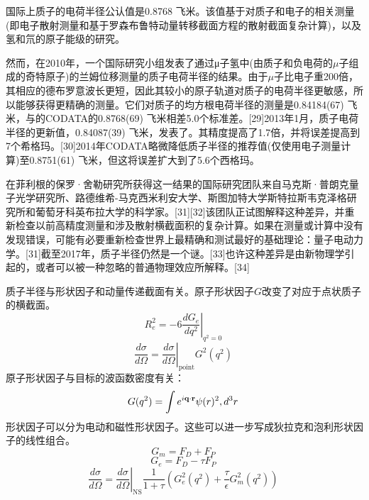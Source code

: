 国际上质子的电荷半径公认值是0.8768 飞米。该值基于对质子和电子的相关测量(即电子散射测量和基于罗森布鲁特动量转移截面方程的散射截面复杂计算)，以及氢和氘的原子能级的研究。

然而，在2010年，一个国际研究小组发表了通过μ子氢中(由质子和负电荷的$\mu$子组成的奇特原子)的兰姆位移测量的质子电荷半径的结果。由于$\mu$子比电子重200倍，其相应的德布罗意波长更短，因此其较小的原子轨道对质子的电荷半径更敏感，所以能够获得更精确的测量。它们对质子的均方根电荷半径的测量是0.84184(67) 飞米，与的CODATA的0.8768(69) 飞米相差5.0个标准差。[29]2013年1月，质子电荷半径的更新值，0.84087(39) 飞米，发表了。其精度提高了1.7倍，并将误差提高到7个希格玛。[30]2014年CODATA略微降低质子半径的推荐值(仅使用电子测量计算)至0.8751(61) 飞米，但这将误差扩大到了5.6个西格玛。

在菲利根的保罗·舍勒研究所获得这一结果的国际研究团队来自马克斯·普朗克量子光学研究所、路德维希-马克西米利安大学、斯图加特大学斯特拉斯韦克泽格研究所和葡萄牙科英布拉大学的科学家。[31][32]该团队正试图解释这种差异，并重新检查以前高精度测量和涉及散射横截面积的复杂计算。如果在测量或计算中没有发现错误，可能有必要重新检查世界上最精确和测试最好的基础理论：量子电动力学。[31]截至2017年，质子半径仍然是一个谜。[33]也许这种差异是由新物理学引起的，或者可以被一种忽略的普通物理效应所解释。[34]

质子半径与形状因子和动量传递截面有关。原子形状因子$G$改变了对应于点状质子的横截面。
\begin{equation}
R_e^2 = -6 \left. \frac{d G_e}{d q^2} \right|_{q^2 = 0}~
\end{equation}
\begin{equation}
\frac{d \sigma}{d \Omega} = \left. \frac{d \sigma}{d \Omega} \right|_{\text{point}} G^2(q^2)~
\end{equation}
原子形状因子与目标的波函数密度有关：
\begin{equation}
G(q^2) = \int e^{i \mathbf{q} \cdot \mathbf{r}} \psi(r)^2 \\, d^3r~
\end{equation}
形状因子可以分为电动和磁性形状因子。这些可以进一步写成狄拉克和泡利形状因子的线性组合。
\begin{equation}
G_m = F_D + F_P~
\end{equation}
\begin{equation}
G_e = F_D - \tau F_P~
\end{equation}
\begin{equation}
\frac{d \sigma}{d \Omega} = \left. \frac{d \sigma}{d \Omega} \right|_{\text{NS}} \frac{1}{1 + \tau} \left( G_e^2(q^2) + \frac{\tau}{\epsilon} G_m^2(q^2) \right)~
\end{equation}

